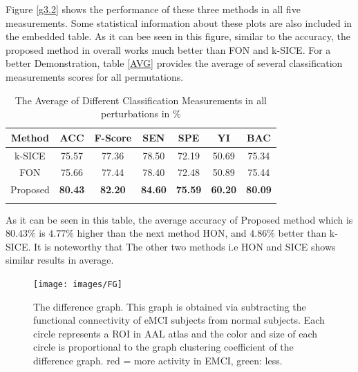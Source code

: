 \documentclass[journal]{IEEEtran}
\begin{document}
	
	Figure \eqref{g3.2} shows the performance of these three methods in all five measurements. Some statistical information about these plots are also included in the embedded table. As it can bee seen in this figure, similar to the accuracy, the proposed method in overall works much better than FON and k-SICE. For a better Demonstration, table \eqref{AVG} provides the average of several classification measurements scores for all permutations. 
	\begin{table}
		\begin{center}
			\caption{The Average of Different Classification Measurements in all perturbations in \% }
			\begin{tabular}{@{}c*{6}{c}}
				\hline\hline
				Method&ACC& F-Score&SEN & SPE &YI & BAC 
				\\
				\hline
				k-SICE  &75.57& 77.36 & 78.50 & 72.19 & 50.69 & 75.34 
				\\
				FON   &75.66& 77.44 & 78.40 & 72.48 & 50.89 & 75.44  
				\\
				Proposed &\textbf{80.43}& \textbf{82.20} & \textbf{84.60} & \textbf{75.59} & \textbf{60.20} & \textbf{80.09}
				
				\\
				
				\hline\hline
				\label{AVG}
			\end{tabular}
		\end{center}
	\end{table}
	As it can be seen in this table, the average accuracy of Proposed method which is $80.43 \%$ is $4.77\%$ higher than the next method HON, and $4.86 \%$ better than k-SICE. It is noteworthy that The other two methods i.e HON and SICE shows similar results in average.  
	
	\begin{figure}
		\centering
		\texttt{[image: images/FG]}
		\caption{
			The difference graph. This graph is obtained via subtracting the functional connectivity of eMCI subjects from normal subjects. Each circle represents a ROI in AAL atlas and the color and size of each circle is proportional to the graph clustering coefficient of the difference graph. red = more activity in EMCI, green: less. 
		}
		\label{g3.3}
	\end{figure}
	
\end{document}
